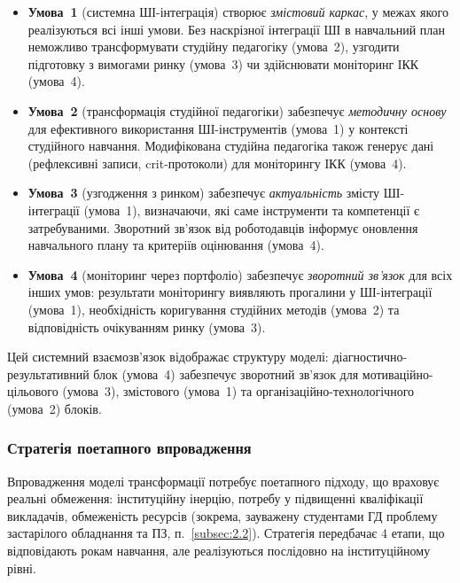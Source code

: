 \begin{itemize}
    \item \textbf{Умова~1} (системна ШІ-інтеграція) створює \textit{змістовий каркас}, у межах якого реалізуються всі інші умови. Без наскрізної інтеграції ШІ в навчальний план неможливо трансформувати студійну педагогіку (умова~2), узгодити підготовку з вимогами ринку (умова~3) чи здійснювати моніторинг ІКК (умова~4).

    \item \textbf{Умова~2} (трансформація студійної педагогіки) забезпечує \textit{методичну основу} для ефективного використання ШІ-інструментів (умова~1) у контексті студійного навчання. Модифікована студійна педагогіка також генерує дані (рефлексивні записи, crit-протоколи) для моніторингу ІКК (умова~4).

    \item \textbf{Умова~3} (узгодження з ринком) забезпечує \textit{актуальність} змісту ШІ-інтеграції (умова~1), визначаючи, які саме інструменти та компетенції є затребуваними. Зворотний зв'язок від роботодавців інформує оновлення навчального плану та критеріїв оцінювання (умова~4).

    \item \textbf{Умова~4} (моніторинг через портфоліо) забезпечує \textit{зворотний зв'язок} для всіх інших умов: результати моніторингу виявляють прогалини у ШІ-інтеграції (умова~1), необхідність коригування студійних методів (умова~2) та відповідність очікуванням ринку (умова~3).
\end{itemize}

Цей системний взаємозв'язок відображає структуру моделі: діагностично-результативний блок (умова~4) забезпечує зворотний зв'язок для мотиваційно-цільового (умова~3), змістового (умова~1) та організаційно-технологічного (умова~2) блоків.

\subsubsection{Стратегія поетапного впровадження}\label{sssec:3.3.3}

Впровадження моделі трансформації потребує поетапного підходу, що враховує реальні обмеження: інституційну інерцію, потребу у підвищенні кваліфікації викладачів, обмеженість ресурсів (зокрема, зауважену студентами ГД проблему застарілого обладнання та ПЗ, п.~\ref{subsec:2.2}). Стратегія передбачає 4 етапи, що відповідають рокам навчання, але реалізуються послідовно на інституційному рівні.

